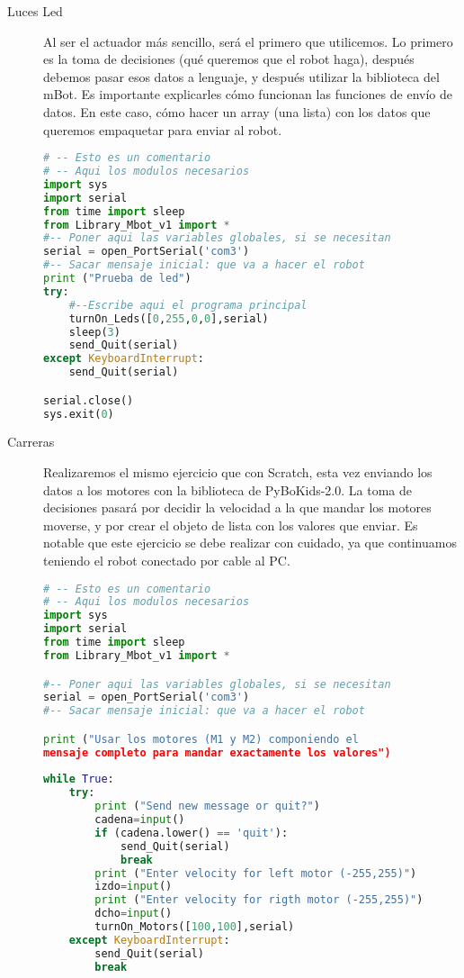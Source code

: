 \begin{description}
	\item [Luces Led] Al ser el actuador más sencillo, será el primero que utilicemos.  Lo primero es la toma de decisiones (qué queremos que el robot haga), después debemos pasar esos datos a lenguaje, y después utilizar la biblioteca del mBot. Es importante explicarles cómo funcionan las funciones de envío de datos. En este caso, cómo hacer un array (una lista) con los datos que queremos empaquetar para enviar al robot.
\begin{lstlisting}[language=python,caption={Solución de referencia del ejercicio de las luces LED para Python}]
# -- Esto es un comentario		
# -- Aqui los modulos necesarios
import sys
import serial
from time import sleep
from Library_Mbot_v1 import *
#-- Poner aqui las variables globales, si se necesitan
serial = open_PortSerial('com3')
#-- Sacar mensaje inicial: que va a hacer el robot
print ("Prueba de led")
try:
	#--Escribe aqui el programa principal
	turnOn_Leds([0,255,0,0],serial)
	sleep(3)
	send_Quit(serial)
except KeyboardInterrupt:
	send_Quit(serial)

serial.close()
sys.exit(0)
\end{lstlisting}
	\item [Carreras] Realizaremos el mismo ejercicio que con Scratch, esta vez enviando los datos a los motores con la biblioteca de PyBoKids-2.0. La toma de decisiones pasará por decidir la velocidad a la que mandar los motores moverse, y por crear el objeto de lista con los valores que enviar. Es notable que este ejercicio se debe realizar con cuidado, ya que continuamos teniendo el robot conectado por cable al PC.
\begin{lstlisting}[language=python,caption={Solución para el ejercicio de carreras en Python}]
# -- Esto es un comentario		
# -- Aqui los modulos necesarios
import sys
import serial
from time import sleep
from Library_Mbot_v1 import *

#-- Poner aqui las variables globales, si se necesitan
serial = open_PortSerial('com3')
#-- Sacar mensaje inicial: que va a hacer el robot

print ("Usar los motores (M1 y M2) componiendo el 
mensaje completo para mandar exactamente los valores")
	
while True:
	try:
		print ("Send new message or quit?")
		cadena=input()
		if (cadena.lower() == 'quit'):
			send_Quit(serial)
			break
		print ("Enter velocity for left motor (-255,255)")
		izdo=input()
		print ("Enter velocity for rigth motor (-255,255)")
		dcho=input()	
		turnOn_Motors([100,100],serial)
	except KeyboardInterrupt:
		send_Quit(serial)
		break
	

\end{lstlisting}
\end{description}
